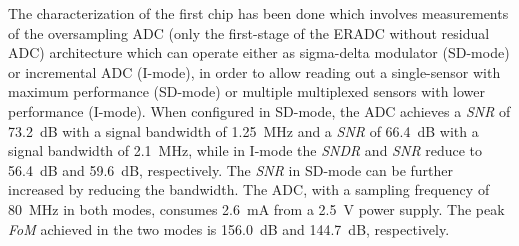 The characterization of the first chip has been done which involves measurements of the oversampling ADC (only the first-stage of the ERADC without residual ADC) architecture which can operate either as sigma-delta modulator (SD-mode) or incremental ADC (I-mode), in order to allow reading out a single-sensor with maximum performance (SD-mode) or multiple multiplexed sensors with lower performance (I-mode). When configured in SD-mode, the ADC achieves a \textit{SNR} of 73.2~dB with a signal bandwidth of 1.25~MHz and a \textit{SNR} of 66.4~dB with a signal bandwidth of 2.1~MHz, while in I-mode the \textit{SNDR} and \textit{SNR} reduce to 56.4~dB and 59.6~dB, respectively. The \textit{SNR} in SD-mode can be further increased by reducing the bandwidth. The ADC, with a sampling frequency of 80~MHz in both modes, consumes 2.6~mA from a 2.5~V power supply. The peak \textit{FoM} achieved in the two modes is 156.0~dB and 144.7~dB, respectively.



